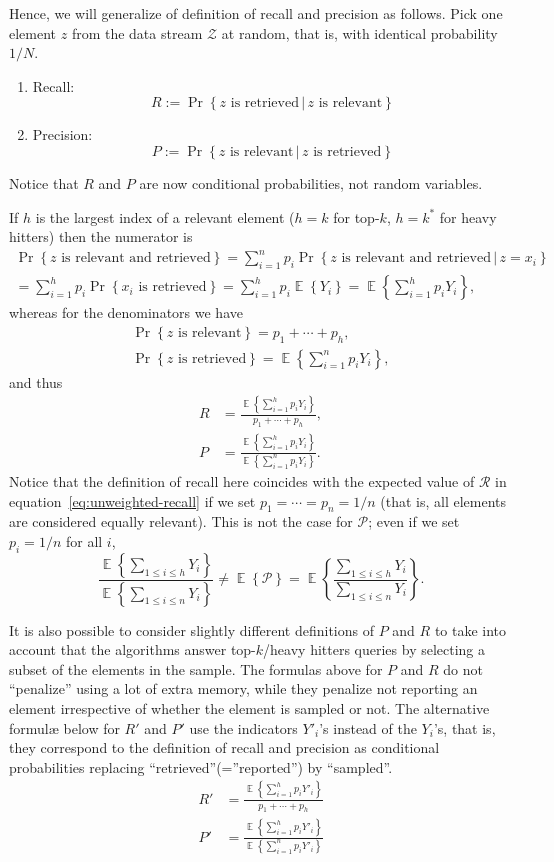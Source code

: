 \documentclass{article}
\newcommand{\Prob}[1]{\Pr\left\{{#1}\right\}}
\newcommand{\Exp}[1]{\mathop{\mathbb{E}}\left\{{#1}\right\}}
\begin{document}
Hence, we will generalize of definition of recall and precision as follows.
Pick one element $z$ from the data stream $\mathcal{Z}$ at random,
that is, with identical probability $1/N$.
\begin{enumerate}
\item Recall:
  \[
  R := \Prob{\text{$z$ is retrieved}\,|\,\text{$z$ is relevant}}
  \]
\item Precision:
  \[
  P := \Prob{\text{$z$ is relevant}\,|\,\text{$z$ is retrieved}}
  \]
\end{enumerate}
Notice that $R$ and $P$ are now conditional probabilities, not random variables.

If $h$ is the largest index of a relevant element ($h=k$ for top-$k$,
$h=k^\ast$ for heavy hitters) then the numerator is
\begin{multline*}
\Prob{\text{$z$ is relevant and retrieved}} =
\sum_{i=1}^{n}p_i \Prob{\text{$z$ is relevant and retrieved}\,|\,z=x_i} \\
= \sum_{i=1}^{h}p_i \Prob{\text{$x_i$ is retrieved}} =
\sum_{i=1}^{h}p_i \Exp{Y_i} = \Exp{\sum_{i=1}^{h}p_i Y_i},
\end{multline*}
whereas for the denominators we have
\begin{gather*}
  \Prob{\text{$z$ is relevant}} = p_1+\cdots+p_h, \\
  \Prob{\text{$z$ is retrieved}} = \Exp{\sum_{i=1}^{n}p_i Y_i},
\end{gather*}
and thus
\begin{align*}
  R &= \frac{\Exp{\sum_{i=1}^{h}p_i Y_i}}{p_1+\cdots+p_h}, \\
  P &= \frac{\Exp{\sum_{i=1}^{h}p_i Y_i}}{\Exp{\sum_{i=1}^{n}p_i Y_i}}.
\end{align*}
Notice that the definition of recall here coincides with the expected value of $\mathcal{R}$ in
equation~\eqref{eq:unweighted-recall} if we set $p_1=\cdots=p_n=1/n$ (that is, all elements are considered
equally relevant). This is not the case for $\mathcal{P}$; even if we set $p_i=1/n$ for all $i$,
\[
\frac{\Exp{\sum_{1\le i\le h}Y_i}}{\Exp{\sum_{1\le i\le n}Y_i}}\not=\Exp{\mathcal{P}}=
\Exp{\frac{\sum_{1\le i\le h}Y_i}{\sum_{1\le i\le n}Y_i}}.
\]

It is also possible to consider slightly different definitions of $P$ and $R$
to take into account that the algorithms answer top-$k$/heavy hitters
queries by selecting a subset of the elements in the sample. The formulas above
for $P$ and $R$ do not ``penalize'' using a lot of extra memory, while
they penalize not reporting an element irrespective of whether
the element is sampled or not. The alternative formul{\ae} below
for $R'$ and $P'$ use the indicators $Y'_i$'s instead of the $Y_i$'s, that is, they correspond to the definition
of recall and precision as conditional probabilities replacing ``retrieved''(=''reported'') by ``sampled''.
\begin{align*}
  R' &= \frac{\Exp{\sum_{i=1}^{h}p_i Y'_i}}{p_1+\cdots+p_h} \\
  P' &= \frac{\Exp{\sum_{i=1}^{h}p_i Y'_i}}{\Exp{\sum_{i=1}^{n}p_i Y'_i}}
\end{align*}
\end{document}
